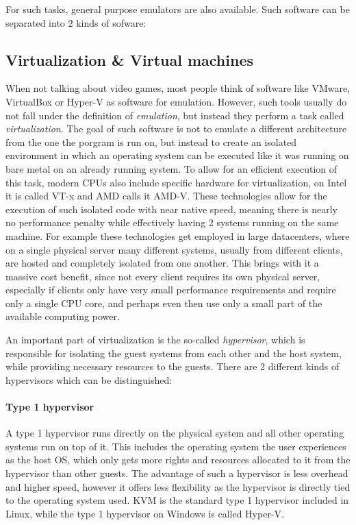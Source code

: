 For such tasks, general purpose emulators are also available.
Such software can be separated into 2 kinds of sofware:

\subsection{Virtualization \& Virtual machines}
When not talking about video games, most people think of software like VMware, VirtualBox or Hyper-V
as software for emulation.
However, such tools usually do not fall under the definition of \emph{emulation},
but instead they perform a task called \emph{virtualization}.
The goal of such software is not to emulate a different architecture from the one the porgram is run on,
but instead to create an isolated environment in which an operating system can be executed
like it was running on bare metal on an already running system.
To allow for an efficient execution of this task, modern CPUs also include specific hardware for virtualization,
on Intel it is called VT-x and AMD calls it AMD-V.
These technologies allow for the execution of such isolated code with near native speed,
meaning there is nearly no performance penalty while effectively having 2 systems running on the same machine.
For example these technologies get employed in large datacenters,
where on a single physical server many different systems, usually from different clients,
are hosted and completely isolated from one another.
This brings with it a massive cost benefit, since not every client requires its own physical server,
especially if clients only have very small performance requirements and require only a single CPU core,
and perhaps even then use only a small part of the available computing power.

An important part of virtualization is the so-called \emph{hypervisor},
which is responsible for isolating the guest systems from each other and the host system,
while providing necessary resources to the guests\cite{hypervisor}.
There are 2 different kinds of hypervisors which can be distinguished:

\paragraph{Type 1 hypervisor} A type 1 hypervisor runs directly on the physical system
and all other operating systems run on top of it.
This includes the operating system the user experiences as the host OS,
which only gets more rights and resources allocated to it from the hypervisor than other guests.
The advantage of such a hypervisor is less overhead and higher speed,
however it offers less flexibility as the hypervisor is directly tied to the operating system used.
KVM is the standard type 1 hypervisor included in Linux,
while the type 1 hypervisor on Windows is called Hyper-V\cite{hypervisor}.

